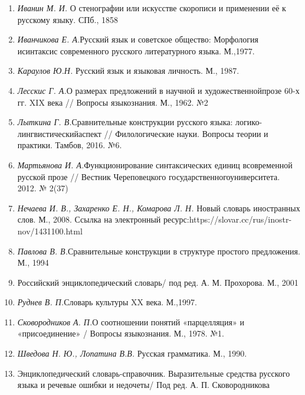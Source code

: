 \begin{enumerate}
        \item \textit{Иванин М. И. }О стенографии или искусстве скорописи и применении её к русскому языку. СПб., 1858
        \item \textit{Иванчикова Е. А.}{Русский язык и советское общество: Морфология исинтаксис современного русского литературного языка. М.,1977.}
        \item \textit{Караулов  Ю.Н. }{Русский язык и языковая личность. М., 1987. }
        \item \textit{Лесскис Г. А.}О размерах предложений в научной и художественнойпрозе 60-х гг. XIX века // Вопросы языкознания. М., 1962. №2
        \item \textit{Лыткина Г. В.}Сравнительные конструкции русского языка: логико-лингвистическийаспект // Филологические науки. Вопросы теории и практики. Тамбов, 2016. №6.
        \item \textit{Мартьянова И. А.}Функционирование синтаксических единиц всовременной русской прозе // Вестник Череповецкого государственногоуниверситета. 2012. № 2(37)
        \item \textit{Нечаева И. В., Захаренко Е. Н., Комарова Л. Н. }Новый словарь иностранных слов. М., 2008. Ссылка на электронный ресурс:https://slovar.cc/rus/inostr-nov/1431100.html
        \item \textit{Павлова В. В.}Сравнительные конструкции в структуре простого предложения. М., 1994
        \item Российский энциклопедический словарь/ под ред. А. М. Прохорова. М., 2001 
        \item \textit{Руднев В. П.}Словарь культуры XX века. М.,1997.
        \item \textit{Сковородников А. П.}О соотношении понятий «парцелляция» и «присоединение» / Вопросы языкознания. М., 1978. №1.
        \item \textit{Шведова Н. Ю., Лопатина В.В. }Русская грамматика. М., 1990. 
        \item Энциклопедический словарь-справочник. Выразительные средства русского языка и речевые ошибки и недочеты/ Под ред. А. П. Сковородникова
      \end{enumerate}